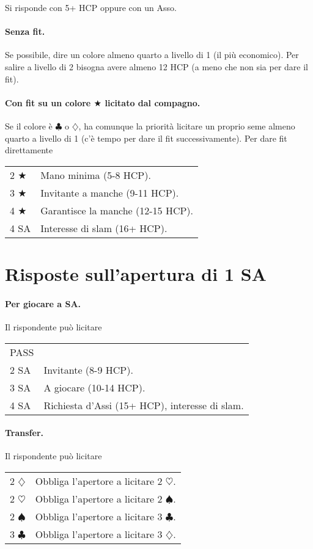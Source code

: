 \documentclass[a4paper,10pt]{article}
\renewcommand{\c}{$\clubsuit$\xspace}
\renewcommand{\d}{$\diamondsuit$\xspace}
\newcommand{\h}{$\heartsuit$\xspace}
\newcommand{\s}{$\spadesuit$\xspace}
\renewcommand{\j}{$\bigstar$\xspace}
\newcommand{\sa}{SA\xspace}
\newcommand{\smallspace}{\vskip0.3cm}
\newenvironment{twocol}
  {\smallspace\noindent\begin{tabular}{l p{0.78\textwidth}}}
  {\end{tabular}\smallspace}
\begin{document}
Si risponde con 5+ HCP oppure con un Asso.

\paragraph{Senza fit.} Se possibile, dire un colore almeno quarto a livello di 1 (il più economico). Per salire a livello di 2 bisogna avere almeno 12 HCP (a meno che non sia per dare il fit).

\paragraph{Con fit su un colore \j licitato dal compagno.} Se il colore è \c o \d, ha comunque la priorità licitare un proprio seme almeno quarto a livello di 1 (c'è tempo per dare il fit successivamente). Per dare fit direttamente
\begin{twocol}
 2 \j & Mano minima (5-8 HCP).\\
 3 \j & Invitante a manche (9-11 HCP).\\
 4 \j & Garantisce la manche (12-15 HCP).\\
 4 \sa & Interesse di slam (16+ HCP).
\end{twocol}

\section{Risposte sull'apertura di 1 \sa}

\paragraph{Per giocare a \sa.} Il rispondente può licitare

\begin{twocol}
 PASS & \\
 2 \sa & Invitante (8-9 HCP).\\
 3 \sa & A giocare (10-14 HCP).\\
 4 \sa & Richiesta d'Assi (15+ HCP), interesse di slam.
\end{twocol}


\paragraph{Transfer.} Il rispondente può licitare

\begin{twocol}
 2 \d & Obbliga l'apertore a licitare 2 \h.\\
 2 \h & Obbliga l'apertore a licitare 2 \s.\\
 2 \s & Obbliga l'apertore a licitare 3 \c.\\
 3 \c & Obbliga l'apertore a licitare 3 \d.\\
\end{twocol}
\end{document}
